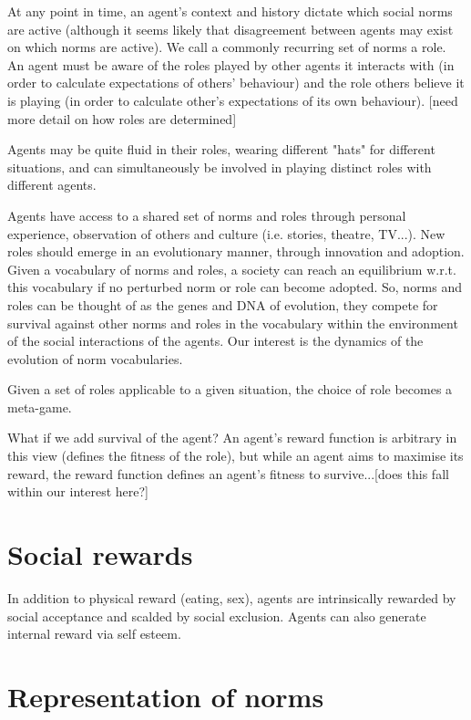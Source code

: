 \documentclass[a4paper]{article}
\begin{document}
At any point in time, an agent's context and history dictate which social norms are active (although it seems likely that disagreement between agents may exist on which norms are active). We call a commonly recurring set of norms a role. An agent must be aware of the roles played by other agents it interacts with (in order to calculate expectations of others' behaviour) and the role others believe it is playing (in order to calculate other's expectations of its own behaviour). [need more detail on how roles are determined]

Agents may be quite fluid in their roles, wearing different "hats" for different situations, and can simultaneously be involved in playing distinct roles with different agents.

Agents have access to a shared set of norms and roles through personal experience, observation of others and culture (i.e. stories, theatre, TV...). New roles should emerge in an evolutionary manner, through innovation and adoption. Given a vocabulary of norms and roles, a society can reach an equilibrium w.r.t. this vocabulary if no perturbed norm or role can become adopted. So, norms and roles can be thought of as the genes and DNA of evolution, they compete for survival against other norms and roles in the vocabulary within the environment of the social interactions of the agents. Our interest is the dynamics of the evolution of norm vocabularies.

Given a set of roles applicable to a given situation, the choice of role becomes a meta-game.

What if we add survival of the agent?
An agent's reward function is arbitrary in this view (defines the fitness of the role), but while an agent aims to maximise its reward, the reward function defines an agent's fitness to survive...[does this fall within our interest here?]

\section{Social rewards}

In addition to physical reward (eating, sex), agents are intrinsically rewarded by social acceptance and scalded by social exclusion. Agents can also generate internal reward via self esteem.

\section{Representation of norms}
\end{document}
